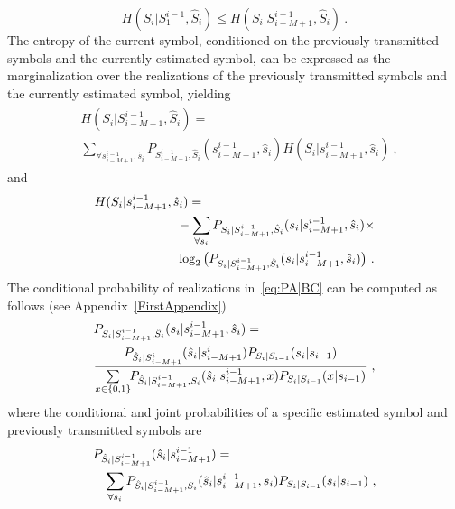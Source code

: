 \documentclass[journal]{IEEEtranTCOM}
\begin{document}
\begin{equation}
    H(S_{i}|S_{1}^{i-1},\hat{S}_{i}) \leq H(S_{i}|S_{i-M+1}^{i-1},\hat{S}_{i})~.
\end{equation}
The entropy of the current symbol, conditioned on the previously transmitted symbols and the currently estimated symbol, can be expressed as the marginalization over the realizations of the previously transmitted symbols and the currently estimated symbol, yielding
\begin{align}
    \begin{split}
    &H(S_{i}|S_{i-M+1}^{i-1},\hat{S}_{i}) =\\& \sum_{\forall s_{i-M+1}^{i-1},\hat{s}_{i}}P_{S_{i-M+1}^{i-1},\hat{S}_{i}}(s_{i-M+1}^{i-1},\hat{s}_{i})H(S_{i}|s_{i-M+1}^{i-1},\hat{s}_{i})~,\label{eq:SGpreShatS}
\end{split}
\end{align}
and
\begin{align}
    \begin{split}
    &H(S_{i}|s_{i-M+1}^{i-1},\hat{s}_{i}) =\\&\hspace{2.3cm} -\sum_{\forall s_{i}}P_{S_{i}|S_{i-M+1}^{i-1},\hat{S}_{i}}(s_{i}|s_{i-M+1}^{i-1},\hat{s}_{i})\times \\&\hspace{2.3cm}  \log_{2}\big(P_{S_{i}|S_{i-M+1}^{i-1},\hat{S}_{i}}(s_{i}|s_{i-M+1}^{i-1},\hat{s}_{i})\big)~.\label{eq:PA|BC}
\end{split}
\end{align}
The conditional probability of realizations in~\eqref{eq:PA|BC} can be computed as follows (see Appendix~\ref{FirstAppendix})
\begin{align}
    \begin{split}
    &P_{S_{i}|S_{i-M+1}^{i-1},\hat{S}_{i}}(s_{i}|s_{i-M+1}^{i-1},\hat{s}_{i}) = \\& \frac{P_{\hat{S}_{i}|S_{i-M+1}^{i}}(\hat{s}_{i}|s_{i-M+1}^{i})P_{S_{i}|S_{i-1}}(s_{i}|s_{i-1})}{\sum\limits_{\substack{x\in\{0,1\}}}\hspace{-.1cm}P_{\hat{S}_{i}|S_{i-M+1}^{i-1},S_{i}}(\hat{s}_{i}|s_{i-M+1}^{i-1},x)P_{S_{i}|S_{i-1}}(x|s_{i-1})}~,
\end{split}
\end{align}
where the conditional and joint probabilities of a specific estimated symbol and previously transmitted symbols are
\begin{align}
    \begin{split}
    &P_{\hat{S}_i|S_{i-M+1}^{i-1}}(\hat{s}_i|s_{i-M+1}^{i-1})=\\&\hspace{0.3cm} \sum\limits_{\substack{\forall s_{i}}}P_{\hat{S}_{i}|S_{i-M+1}^{i-1},S_{i}}(\hat{s}_{i}|s_{i-M+1}^{i-1},s_{i})P_{S_{i}|S_{i-1}}(s_{i}|s_{i-1})~,
\end{split}
\end{align}
\end{document}
